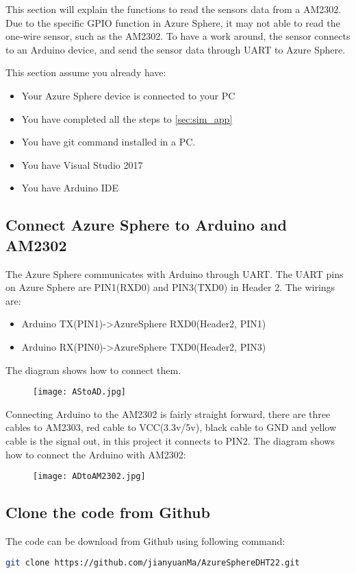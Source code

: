 This section will explain the functions to read the sensors data from a AM2302. Due to the specific GPIO function in Azure Sphere, it may not able to read the one-wire sensor, such as the AM2302. To have a work around, the sensor connects to an Arduino device, and send the sensor data through UART to Azure Sphere. 

This section assume you already have:
\begin{itemize}
    \item Your Azure Sphere device is connected to your PC
    \item You have completed all the steps to \autoref{sec:sim_app}
    \item You have git command installed in a PC.
    \item You have Visual Studio 2017
    \item You have Arduino IDE
\end{itemize}

\subsection{Connect Azure Sphere to Arduino and AM2302}
The Azure Sphere communicates with Arduino through UART. The UART pins on Azure Sphere are PIN1(RXD0) and PIN3(TXD0) in Header 2. The wirings are:  
\begin{itemize}
    \item Arduino TX(PIN1)->AzureSphere RXD0(Header2, PIN1)
    \item Arduino RX(PIN0)->AzureSphere TXD0(Header2, PIN3)
\end{itemize}

The diagram shows how to connect them. 
\begin{figure}[h]
    \texttt{[image: AStoAD.jpg]}
\end{figure}

Connecting Arduino to the AM2302 is fairly straight forward, there are three cables to AM2303, red cable to VCC(3.3v/5v), black cable to GND and yellow cable is the signal out, in this project it connects to PIN2.
The diagram shows how to connect the Arduino with AM2302:
\begin{figure}[h]
    \texttt{[image: ADtoAM2302.jpg]}
\end{figure}

\subsection{Clone the code from Github}
The code can be download from Github using following command:
\begin{lstlisting}[language=bash]
git clone https://github.com/jianyuanMa/AzureSphereDHT22.git
\end{lstlisting}

